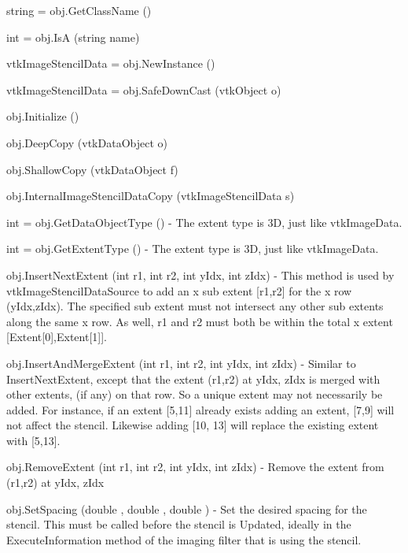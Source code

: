 \begin{DoxyItemize}
\item {\ttfamily string = obj.\-Get\-Class\-Name ()}  
\item {\ttfamily int = obj.\-Is\-A (string name)}  
\item {\ttfamily vtk\-Image\-Stencil\-Data = obj.\-New\-Instance ()}  
\item {\ttfamily vtk\-Image\-Stencil\-Data = obj.\-Safe\-Down\-Cast (vtk\-Object o)}  
\item {\ttfamily obj.\-Initialize ()}  
\item {\ttfamily obj.\-Deep\-Copy (vtk\-Data\-Object o)}  
\item {\ttfamily obj.\-Shallow\-Copy (vtk\-Data\-Object f)}  
\item {\ttfamily obj.\-Internal\-Image\-Stencil\-Data\-Copy (vtk\-Image\-Stencil\-Data s)}  
\item {\ttfamily int = obj.\-Get\-Data\-Object\-Type ()} -\/ The extent type is 3\-D, just like vtk\-Image\-Data.  
\item {\ttfamily int = obj.\-Get\-Extent\-Type ()} -\/ The extent type is 3\-D, just like vtk\-Image\-Data.  
\item {\ttfamily obj.\-Insert\-Next\-Extent (int r1, int r2, int y\-Idx, int z\-Idx)} -\/ This method is used by vtk\-Image\-Stencil\-Data\-Source to add an x sub extent \mbox{[}r1,r2\mbox{]} for the x row (y\-Idx,z\-Idx). The specified sub extent must not intersect any other sub extents along the same x row. As well, r1 and r2 must both be within the total x extent \mbox{[}Extent\mbox{[}0\mbox{]},Extent\mbox{[}1\mbox{]}\mbox{]}.  
\item {\ttfamily obj.\-Insert\-And\-Merge\-Extent (int r1, int r2, int y\-Idx, int z\-Idx)} -\/ Similar to Insert\-Next\-Extent, except that the extent (r1,r2) at y\-Idx, z\-Idx is merged with other extents, (if any) on that row. So a unique extent may not necessarily be added. For instance, if an extent \mbox{[}5,11\mbox{]} already exists adding an extent, \mbox{[}7,9\mbox{]} will not affect the stencil. Likewise adding \mbox{[}10, 13\mbox{]} will replace the existing extent with \mbox{[}5,13\mbox{]}.  
\item {\ttfamily obj.\-Remove\-Extent (int r1, int r2, int y\-Idx, int z\-Idx)} -\/ Remove the extent from (r1,r2) at y\-Idx, z\-Idx  
\item {\ttfamily obj.\-Set\-Spacing (double , double , double )} -\/ Set the desired spacing for the stencil. This must be called before the stencil is Updated, ideally in the Execute\-Information method of the imaging filter that is using the stencil.  

\end{DoxyItemize}
